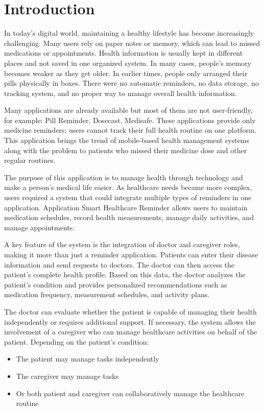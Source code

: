 \chapter{Introduction}
\label{ch:introduction}

In today's digital world, maintaining a healthy lifestyle has become increasingly challenging. Many users rely on paper notes or memory, which can lead to missed medications or appointments. Health information is usually kept in different places and not saved in one organized system. In many cases, people's memory becomes weaker as they get older. In earlier times, people only arranged their pills physically in boxes. There were no automatic reminders, no data storage, no tracking system, and no proper way to manage overall health information.

Many applications are already available but most of them are not user-friendly, for example: Pill Reminder, Dosecast, Medisafe. These applications provide only medicine reminders; users cannot track their full health routine on one platform. This application brings the trend of mobile-based health management systems along with the problem to patients who missed their medicine dose and other regular routines.

The purpose of this application is to manage health through technology and make a person's medical life easier. As healthcare needs became more complex, users required a system that could integrate multiple types of reminders in one application. Application Smart Healthcare Reminder allows users to maintain medication schedules, record health measurements, manage daily activities, and manage appointments.

A key feature of the system is the integration of doctor and caregiver roles, making it more than just a reminder application. Patients can enter their disease information and send requests to doctors. The doctor can then access the patient's complete health profile. Based on this data, the doctor analyzes the patient's condition and provides personalized recommendations such as medication frequency, measurement schedules, and activity plans.

The doctor can evaluate whether the patient is capable of managing their health independently or requires additional support. If necessary, the system allows the involvement of a caregiver who can manage healthcare activities on behalf of the patient. Depending on the patient's condition:
\begin{itemize}
    \item The patient may manage tasks independently
    \item The caregiver may manage tasks
    \item Or both patient and caregiver can collaboratively manage the healthcare routine
\end{itemize}

